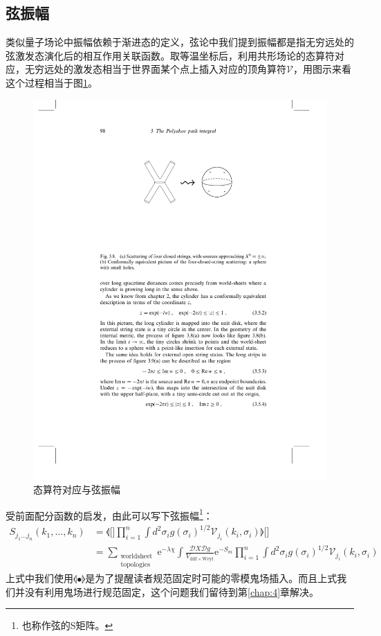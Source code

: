 \subsection{弦振幅}
类似量子场论中振幅依赖于渐进态的定义，弦论中我们提到振幅都是指无穷远处的弦激发态演化后的相互作用关联函数。取等温坐标后，利用共形场论的态算符对应，无穷远处的激发态相当于世界面某个点上插入对应的顶角算符$\mathscr{V}$，用图示来看这个过程相当于图\ref{fig:1}。
\begin{figure}[htbp]
	\centering
	\includegraphics{figs/fig1.pdf}
	\caption{态算符对应与弦振幅}
	\label{fig:1}
\end{figure}
受前面配分函数的启发，由此可以写下弦振幅\footnote{也称作弦的S矩阵。}：
\begin{equation}
	\label{eq:2.39}
	\begin{aligned}
		S_{j_1...j_n}(k_1,\ldots,k_n)&=\llangle[\Big]\prod_{i=1}^n\int d^2\sigma_ig(\sigma_i)^{1/2}\mathscr{V}_{j_i}(k_i,\sigma_i)\rrangle[\Big]
		\\&=\sum_{\substack{\text{worldsheet}\\\text{topologies}}}\mathrm{e}^{-\lambda \chi}\int\frac{\mathcal{D}X\mathcal{D}g}{V_{\mathrm{diff}\times\mathrm{Weyl}}}\mathrm{e}^{-S_m}\prod_{i=1}^n\int d^2\sigma_ig(\sigma_i)^{1/2}\mathscr{V}_{j_i}(k_i,\sigma_i)
	\end{aligned}
\end{equation}
上式中我们使用$\llangle\bullet\rrangle$是为了提醒读者规范固定时可能的零模鬼场插入。而且上式我们并没有利用鬼场进行规范固定，这个问题我们留待到第\ref{chap:4}章解决。
